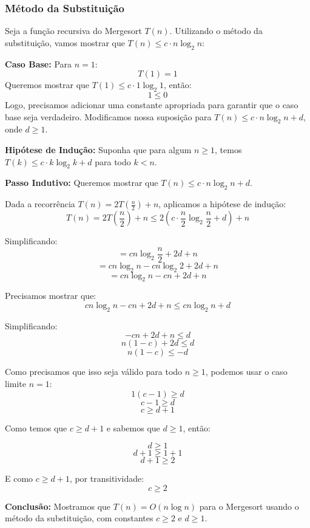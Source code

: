 \subsubsection{Método da Substituição}

Seja a função recursiva do Mergesort \(T(n)\). Utilizando o método da substituição, vamos mostrar que \( T(n) \leq c \cdot n\log_2 n \):

\textbf{Caso Base:} Para \( n = 1 \):
\[ T(1) = 1 \]
Queremos mostrar que \( T(1) \leq c \cdot 1\log_2 1 \), então:
\[ 1 \leq 0 \]
Logo, precisamos adicionar uma constante apropriada para garantir que o caso base seja verdadeiro.
Modificamos nossa suposição para \( T(n) \leq c \cdot n\log_2 n + d \), onde \( d \geq 1 \).

\textbf{Hipótese de Indução:} Suponha que para algum \( n \geq 1 \), temos \( T(k) \leq c \cdot k\log_2 k + d \) para todo \( k < n \).

\textbf{Passo Indutivo:} Queremos mostrar que \( T(n) \leq c \cdot n\log_2 n + d \).

Dada a recorrência \( T(n) = 2T(\frac{n}{2}) + n \), aplicamos a hipótese de indução:
\[ T(n) = 2T(\frac{n}{2}) + n \leq 2(c \cdot \frac{n}{2}\log_2 \frac{n}{2} + d) + n \]

Simplificando:
\[ = cn\log_2 \frac{n}{2} + 2d + n \]
\[ = cn\log_2 n - cn\log_2 2 + 2d + n \]
\[ = cn\log_2 n - cn + 2d + n \]

Precisamos mostrar que:
\[ cn\log_2 n - cn + 2d + n \leq cn\log_2 n + d \]

Simplificando:
\[ -cn + 2d + n \leq d \]
\[ n(1-c) + 2d \leq d \]
\[ n(1-c) \leq -d \]

Como precisamos que isso seja válido para todo \( n \geq 1 \), podemos usar o caso limite \( n = 1 \):
\[ 1(c-1) \geq d \]
\[ c-1 \geq d \]
\[ c \geq d+1 \]

Como temos que \( c \geq d+1 \) e sabemos que \( d \geq 1 \), então:

\[ d \geq 1 \]
\[ d + 1 \geq 1 + 1 \]
\[ d + 1 \geq 2 \]

E como \( c \geq d+1 \), por transitividade:
\[ c \geq 2 \]

\textbf{Conclusão:} Mostramos que \( T(n) = O(n\log n) \) para o Mergesort usando o método da substituição, com constantes \( c \geq 2 \) e \( d \geq 1 \).